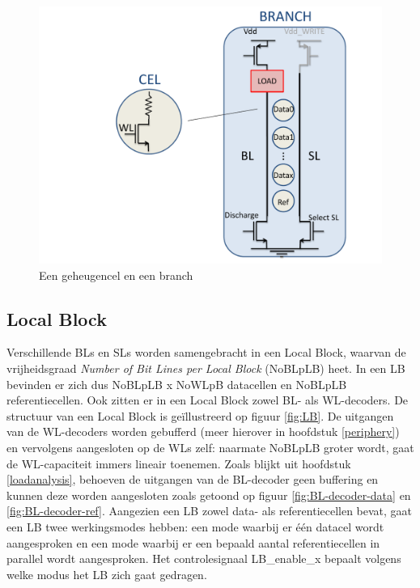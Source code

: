 \begin{figure}
  \centering
  \includegraphics[scale=0.3]{../fig/hfdstk-architecture-cell-branch.pdf}
  \caption{Een geheugencel en een branch}
  \label{fig:cellbranch}
\end{figure}

\subsection{Local Block}
Verschillende BLs en SLs worden samengebracht in een Local Block, waarvan de vrijheidsgraad \emph{Number of Bit Lines per Local Block} (NoBLpLB) heet. In een LB bevinden er zich dus NoBLpLB x NoWLpB datacellen en NoBLpLB referentiecellen. Ook zitten er in een Local Block zowel BL- als WL-decoders.
De structuur van een Local Block is geïllustreerd op figuur \ref{fig:LB}.
De uitgangen van de WL-decoders worden gebufferd (meer hierover in hoofdstuk \ref{periphery}) en vervolgens aangesloten op de WLs zelf: naarmate NoBLpLB groter wordt, gaat de WL-capaciteit immers lineair toenemen.
Zoals blijkt uit hoofdstuk \ref{loadanalysis}, behoeven de uitgangen van de BL-decoder geen buffering en kunnen deze worden aangesloten zoals getoond op figuur \ref{fig:BL-decoder-data} en \ref{fig:BL-decoder-ref}.
Aangezien een LB zowel data- als referentiecellen bevat, gaat een LB twee werkingsmodes hebben: een mode waarbij er één datacel wordt aangesproken en een mode waarbij er een bepaald aantal referentiecellen in parallel wordt aangesproken.
Het controlesignaal LB\_enable\_x bepaalt volgens welke modus het LB zich gaat gedragen.


